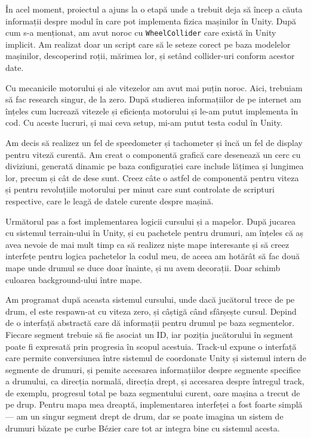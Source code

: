 \documentclass[a4paper,12pt]{report}
\begin{document}
În acel moment, proiectul a ajuns la o etapă unde a trebuit deja să încep a căuta informații despre modul în care pot implementa fizica mașinilor în Unity.
După cum s-a menționat, am avut noroc cu \texttt{WheelCollider} care există în Unity implicit.
Am realizat doar un script care să le seteze corect pe baza modelelor mașinilor, descoperind roții, mărimea lor, și setând collider-uri conform acestor date.

Cu mecanicile motorului și ale vitezelor am avut mai puțin noroc.
Aici, trebuiam să fac research singur, de la zero.
După studierea informațiilor de pe internet am înțeles cum lucrează vitezele și eficiența motorului și le-am putut implementa în cod.
Cu aceste lucruri, și mai ceva setup, mi-am putut testa codul în Unity.

Am decis să realizez un fel de speedometer și tachometer și încă un fel de display pentru viteză curentă.
Am creat o componentă grafică care desenează un cerc cu diviziuni, generată dinamic pe baza configurației care include lățimea și lungimea lor, precum și cât de dese sunt.
Creez câte o astfel de componentă pentru viteza și pentru revoluțiile motorului per minut care sunt controlate de scripturi respective, care le leagă de datele curente despre mașină.

Următorul pas a fost implementarea logicii cursului și a mapelor.
După jucarea cu sistemul terrain-ului în Unity, și cu pachetele pentru drumuri, am înțeles că aș avea nevoie de mai mult timp ca să realizez niște mape interesante și să creez interfețe pentru logica pachetelor la codul meu, de aceea am hotărât să fac două mape unde drumul se duce doar înainte, și nu avem decorații.
Doar schimb culoarea background-ului între mape.

Am programat după aceasta sistemul cursului, unde dacă jucătorul trece de pe drum, el este respawn-at cu viteza zero, și câștigă când sfârșește cursul.
Depind de o interfață abstractă care dă informații pentru drumul pe baza segmentelor.
Fiecare segment trebuie să fie asociat un ID, iar poziția jucătorului în segment poate fi expresată prin progresia în scopul acestuia.
Track-ul expune o interfață care permite conversiunea între sistemul de coordonate Unity și sistemul intern de segmente de drumuri, și pemite accesarea informațiilor despre segmente specifice a drumului, ca direcția normală, direcția drept, și accesarea despre întregul track, de exemplu, progresul total pe baza segmentului curent, oare mașina a trecut de pe drup.
Pentru mapa mea dreaptă, implementarea interfeței a fost foarte simplă --- am un singur segment drept de drum, dar se poate imagina un sistem de drumuri băzate pe curbe Bézier care tot ar integra bine cu sistemul acesta.
\end{document}
